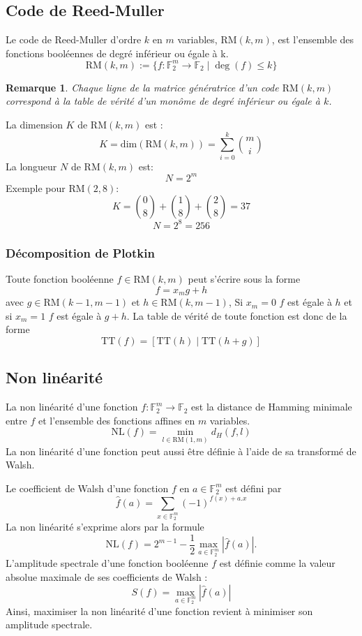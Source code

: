 \documentclass{article}
\def\RM#1#2{\ensuremath{\mathrm{RM}(#1, #2)}}
\def\FF{\ensuremath{\mathbb{F}}}
\newtheorem{remark}{Remarque}
\begin{document}
\subsection{Code de Reed-Muller}
Le code de Reed-Muller d'ordre $k$ en $m$ variables, $\mathrm{RM}(k, m)$, est l'ensemble des fonctions booléennes de degré inférieur ou égale à k.
$$ \RM{k}{m} := \{f: \FF_2^m \to \FF_2 \mid \deg(f) \leq k\} $$
\begin{remark}
	Chaque ligne de la matrice génératrice d'un code \RM{k}{m} correspond à la table de vérité d'un monôme de degré inférieur ou égale à $k$.
\end{remark}
La dimension $K$ de \RM{k}{m} est : 
$$ K = \mathrm{dim}(\RM{k}{m}) = \sum_{i=0}^{k} \binom{m}{i}$$
La longueur $N$ de \RM{k}{m} est:
$$N=2^m$$
Exemple pour \RM{2}{8}:
$$K = \binom{0}{8} + \binom{1}{8} + \binom{2}{8} = 37$$
$$N = 2^8 = 256$$

\subsubsection{Décomposition de Plotkin}
Toute fonction booléenne $f \in \RM{k}{m}$ peut s'écrire sous la forme
$$f = x_mg + h$$ avec $g \in \RM{k-1}{m-1}$ et $h \in \RM{k}{m-1}$,
Si $x_m = 0$ $f$ est égale à $h$ et si $x_m = 1$ $f$ est égale à $g+h$. La table de vérité de toute fonction est donc de la forme
$$\text{TT}(f)=[\text{TT}(h) \mid \text{TT}(h+g)]$$

\subsection{Non linéarité}
La non linéarité d'une fonction $f : \FF_2^m \to \FF_2$ est la distance de Hamming minimale entre $f$ et l'ensemble des fonctions affines en $m$ variables.
$$
\mathrm{NL}(f) = \min_{l \in \RM{1}{m}} d_H(f, l)
$$
La non linéarité d'une fonction peut aussi être définie à l'aide de sa transformé de Walsh.

Le coefficient de Walsh d'une fonction $f$ en $a \in \FF_2^m$ est défini par
$$
\widehat{f}(a) = \sum_{x \in \FF_2^m} (-1)^{f(x) + a.x}
$$
La non linéarité s'exprime alors par la formule
$$
\mathrm{NL}(f) = 2^{m-1} - \frac{1}{2}\max_{a \in \FF_2^m}|\widehat{f}(a)|.
$$
L'amplitude spectrale d'une fonction booléenne $f$ est définie comme la valeur absolue maximale
de ses coefficients de Walsh : 
$$
S(f) = \max_{a \in \FF_2^m} |\widehat{f}(a)|
$$
Ainsi, maximiser la non linéarité d'une fonction revient à minimiser son amplitude spectrale.
\end{document}
